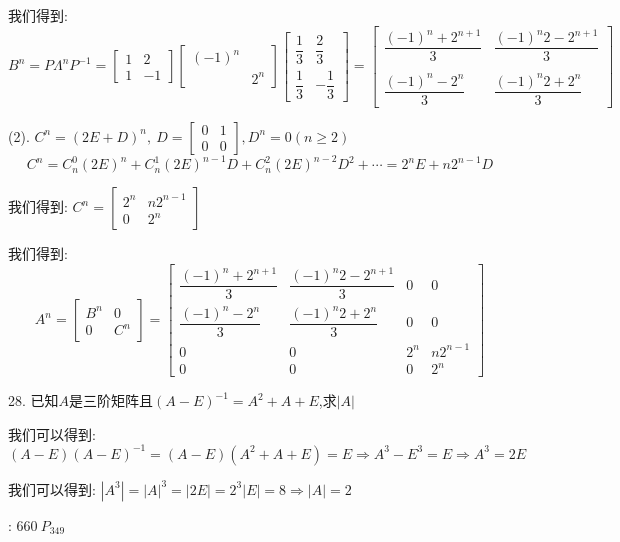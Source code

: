 \begin{solution}
我们得到:  $$B^n=P\varLambda^n P^{-1}=\left[\begin{matrix}
	1&2\\1&-1
\end{matrix} \right]\left[\begin{matrix}
(-1)^n&\\ &2^n
\end{matrix} \right]\left[\begin{matrix}
\dfrac{1}{3}&\dfrac{2}{3}\\\dfrac{1}{3}&-\dfrac{1}{3}
\end{matrix} \right]=\left[\begin{matrix}
\dfrac{(-1)^n+2^{n+1}}{3}&\dfrac{(-1)^n2-2^{n+1}}{3}\\
\\\dfrac{(-1)^n-2^n}{3}&\dfrac{(-1)^n2+2^n}{3}
\end{matrix} \right]$$

(2). $C^n=(2E+D)^n,\ D=\left[ \begin{matrix}
	0&1\\0&0
\end{matrix}\right],D^{n}=0(n\geq 2)$
$$C^n=C_{n}^{0}(2E)^n+C_{n}^{1}(2E)^{n-1}D+C_{n}^{2}(2E)^{n-2}D^2+\cdots=2^nE+n2^{n-1}D$$

我们得到:  $C^n=\left[ \begin{matrix}
	2^n&n2^{n-1}\\0&2^n
\end{matrix}\right]$

我们得到:  
$$A^n=\left[ \begin{matrix}
	B^n&0\\0&C^n
\end{matrix}\right]=\left[ \begin{matrix}
\dfrac{(-1)^n+2^{n+1}}{3}&\dfrac{(-1)^n2-2^{n+1}}{3}&0&0\\
\dfrac{(-1)^n-2^n}{3}&\dfrac{(-1)^n2+2^n}{3}&0&0\\
0&0&2^n&n2^{n-1}\\0&0&0&2^n
\end{matrix}\right]$$
\end{solution}

28. 已知$A$是三阶矩阵且$(A-E)^{-1}=A^2+A+E$,求$|A|$
\begin{solution}
	
	我们可以得到:  
	$$(A-E)(A-E)^{-1}=(A-E)(A^2+A+E)=E\Rightarrow A^3-E^3=E\Rightarrow A^3=2E$$
	
	我们可以得到:  $|A^3|=|A|^3=|2E|=2^3|E|=8\Rightarrow |A|=2$
\end{solution}
\begin{anymark}[注]
	[题目来源]:  $660 \ P_{349}$
\end{anymark}

